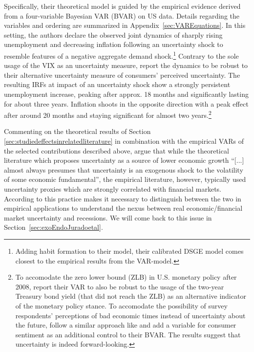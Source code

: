 \documentclass[a4paper,11pt,listof=nochaptergap,oneside,pointednumbers,bibtotoc,bigheadings,liststotoc,hidelinks]{scrbook}
\theoremstyle{mysatz}
\theoremstyle{mydefinition}
\theoremstyle{mytheorem}
\theoremstyle{mybemerkung}
\begin{document}
Specifically, their theoretical model is guided by the empirical evidence derived from a four-variable Bayesian VAR (BVAR) on US data. Details regarding the variables and ordering are summarized in Appendix~\ref{sec:VAREquations}. In this setting, the authors declare the observed joint dynamics of sharply rising unemployment and decreasing inflation following an uncertainty shock to resemble features of a negative aggregate demand shock.\footnote{Adding habit formation to their model, their calibrated DSGE model comes closest to the empirical results from the VAR-model.} Contrary to the sole usage of the VIX as an uncertainty measure, \citet{leducandliu:16} report the dynamics to be robust to their alternative uncertainty measure of consumers' perceived uncertainty. The resulting IRFs at impact of an uncertainty shock show a strongly persistent unemployment increase, peaking after approx. 18 months and significantly lasting for about three years. Inflation shoots in the opposite direction with a peak effect after around 20 months and staying significant for almost two years.\footnote{To accomodate the zero lower bound (ZLB) in U.S. monetary policy after 2008, \citet{leducandliu:16} report their VAR to also be robust to the usage of the two-year Treasury bond yield (that did not reach the ZLB) as an alternative indicator of the monetary policy stance. To accomodate the possibility of survey respondents' perceptions of bad economic times instead of uncertainty about the future, \citet{leducandliu:16} follow a similar approach like \citet{bakeretal:15} and add a variable for consumer sentiment as an additional control to their BVAR. The results suggest that uncertainty is indeed forward-looking.}

Commenting on the theoretical results of Section \ref{sec:studiedeffectsinrelatedliterature} in combination with the empirical VARs of the selected contributions described above, \citet[p. 4]{ludvigsonetal:18} argue that while the theoretical literature which proposes uncertainty as a source of lower economic growth ``[...] almost always presumes that uncertainty is an exogenous shock to the volatility of some economic fundamental'', the empirical literature, however, typically used uncertainty proxies which are strongly correlated with financial markets. According to \citet{ludvigsonetal:18} this practice makes it necessary to distinguish between the two in empirical applications to understand the nexus between real economic/financial market uncertainty and recessions. We will come back to this issue in Section~\ref{sec:exoEndoJuradoetal}.
\end{document}
